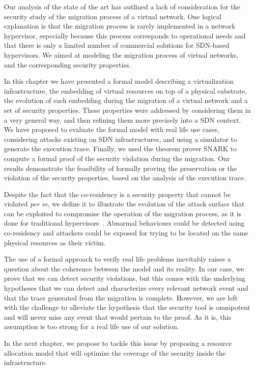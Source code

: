 Our analysis of the state of the art has outlined a lack of consideration for the security study of the migration process of a virtual network.
One logical explanation is that the migration process is rarely implemented in a network hypervisor, especially because this process corresponds to operational needs and that there is only a limited number of commercial solutions for SDN-based hypervisors.
We aimed at modeling the migration process of virtual networks, and the corresponding security properties.

In this chapter we have presented a formal model describing a virtualization infrastructure, the embedding of virtual resources on top of a physical substrate, the evolution of such embedding during the migration of a virtual network and a set of security properties. These properties were addressed by considering them in a very general way, and then refining them more precisely into a SDN context. We have proposed to evaluate the formal model with real life use cases, considering attacks existing on SDN infrastructures, and using a simulator to generate the execution trace. Finally, we used the theorem prover SNARK to compute a formal proof of the security violation during the migration. Our results demonstrate the feasibility of formally proving the preservation or the violation of the security properties, based on the analysis of the execution trace.

Despite the fact that the co-residency is a security property that cannot be violated \textit{per se}, we define it to illustrate the evolution of the attack surface that can be exploited to compromise the operation of the migration process, as it is done for traditional hypervisors~\cite{stalling-atya2017,malicious-atya2017}.
Abnormal behaviours could be detected using co-residency and attackers could be exposed for trying to be located on the same physical resources as their victim. 

The use of a formal approach to verify real life problems inevitably raises a question about the coherence between the model and its reality.
In our case, we prove that we can detect security violations, but this comes with the underlying hypotheses that we can detect and characterize every relevant network event and that the trace generated from the migration is complete. However, we are left with the challenge to alleviate the hypothesis that the security tool is omnipotent and will never miss any event that would pertain to the proof. As it is, this assumption is too strong for a real life use of our solution.

In the next chapter, we propose to tackle this issue by proposing a resource allocation model that will optimize the coverage of the security inside the infrastructure.